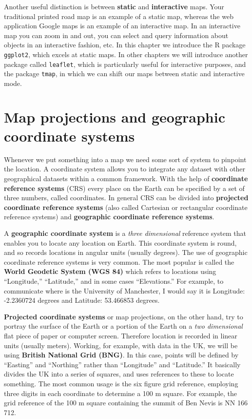 \documentclass[
  krantz2]{krantz}
\begin{document}
Another useful distinction is between \textbf{static} and \textbf{interactive} maps. Your traditional printed road map is an example of a static map, whereas the web application Google maps is an example of an interactive map. In an interactive map you can zoom in and out, you can select and query information about objects in an interactive fashion, etc. In this chapter we introduce the R package \texttt{ggplot2}, which excels at static maps. In other chapters we will introduce another package called \texttt{leaflet}, which is particularly useful for interactive purposes, and the package \texttt{tmap}, in which we can shift our maps between static and interactive mode.

\hypertarget{map-projections-and-geographic-coordinate-systems}{%
\section{Map projections and geographic coordinate systems}\label{map-projections-and-geographic-coordinate-systems}}

Whenever we put something into a map we need some sort of system to pinpoint the location. A coordinate system allows you to integrate any dataset with other geographical datasets within a common framework. With the help of \textbf{coordinate reference systems} (CRS) every place on the Earth can be specified by a set of three numbers, called coordinates. In general CRS can be divided into \textbf{projected coordinate reference systems} (also called Cartesian or rectangular coordinate reference systems) and \textbf{geographic coordinate reference systems}.

A \textbf{geographic coordinate system} is a \emph{three dimensional} reference system that enables you to locate any location on Earth. This coordinate system is round, and so records locations in angular units (usually degrees). The use of geographic coordinate reference systems is very common. The most popular is called the \textbf{World Geodetic System (WGS 84)} which refers to locations using ``Longitude,'' ``Latitude,'' and in some cases ``Elevations.'' For example, to communicate where is the University of Manchester, I would say it is Longitude: -2.2360724 degrees and Latitude: 53.466853 degrees.

\textbf{Projected coordinate systems} or map projections, on the other hand, try to portray the surface of the Earth or a portion of the Earth on a \emph{two dimensional} flat piece of paper or computer screen. Therefore location is recorded in linear units (usually meters). Working, for example, with data in the UK, we will be using \textbf{British National Grid (BNG)}. In this case, points will be defined by ``Easting'' and ``Northing'' rather than ``Longitude'' and ``Latitude.'' It basically divides the UK into a series of squares, and uses references to these to locate something. The most common usage is the six figure grid reference, employing three digits in each coordinate to determine a 100 m square. For example, the grid reference of the 100 m square containing the summit of Ben Nevis is NN 166 712.
\end{document}
